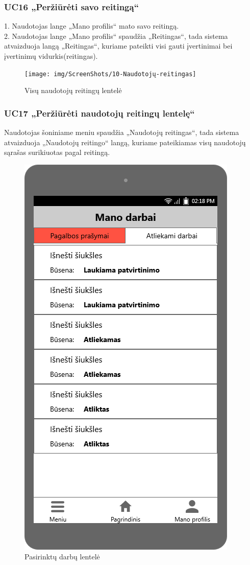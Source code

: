 \documentclass{VUMIFPSbakalaurinis}
\begin{document}
\subsubsection{UC16 „Peržiūrėti savo reitingą“}
1. Naudotojas lange „Mano profilis“ mato savo reitingą. \\
2. Naudotojas lange „Mano profilis“ spaudžia „Reitingas“, tada sistema atvaizduoja langą „Reitingas“, kuriame pateikti visi gauti įvertinimai bei įvertinimų vidurkis(reitingas).

\begin{figure}[H]
	\centering
	\texttt{[image: img/ScreenShots/10-Naudotojų-reitingas]}
	\caption{Visų naudotojų reitingų lentelė}
	\label{img:rating table}
\end{figure}
\subsubsection{UC17 „Peržiūrėti naudotojų reitingų lentelę“}
Naudotojas šoniniame meniu spaudžia „Naudotojų reitingas“, tada sistema atvaizduoja „Naudotojų reitingo“ langą, kuriame pateikiamas visų naudotojų sąrašas surikiuotas pagal reitingą.

\begin{figure}[H]
	\centering
	\includegraphics[scale=0.4]{img/ScreenShots/06-Mano-darbai2}
	\caption{Pasirinktų darbų lentelė}
	\label{img:selected jobs table}
\end{figure}
\end{document}

